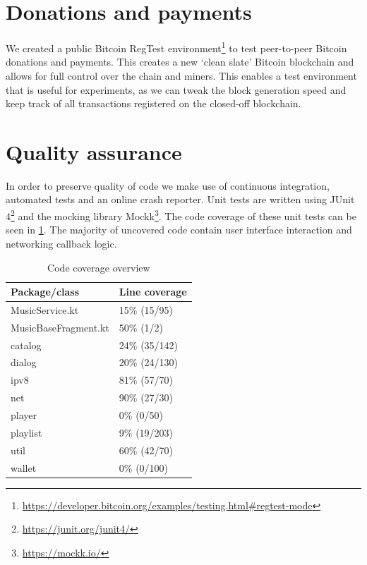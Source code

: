 \section{Donations and payments}
\label{sec:regtest-network-impl}
We created a public Bitcoin RegTest environment\footnote{\url{https://developer.bitcoin.org/examples/testing.html\#regtest-mode}} to test peer-to-peer Bitcoin donations and payments. This creates a new `clean slate' Bitcoin blockchain and allows for full control over the chain and miners. This enables a test environment that is useful for experiments, as we can tweak the block generation speed and keep track of all transactions registered on the closed-off blockchain.

\section{Quality assurance}
In order to preserve quality of code we make use of continuous integration, automated tests and an online crash reporter. Unit tests are written using JUnit 4\footnote{\url{https://junit.org/junit4/}} and the mocking library Mockk\footnote{\url{https://mockk.io/}}. The code coverage of these unit tests can be seen in \ref{tab:code-cov}. The majority of uncovered code contain user interface interaction and networking callback logic. 

\begin{table}[]
\begin{tabular}{|l|l|}
\hline
\textbf{Package/class} & \textbf{Line coverage} \\ \hline
MusicService.kt        & 15\% (15/95)           \\ \hline
MusicBaseFragment.kt   & 50\% (1/2)             \\ \hline
catalog                & 24\% (35/142)          \\ \hline
dialog                 & 20\% (24/130)          \\ \hline
ipv8                   & 81\% (57/70)           \\ \hline
net                    & 90\% (27/30)           \\ \hline
player                 & 0\% (0/50)             \\ \hline
playlist               & 9\% (19/203)           \\ \hline
util                   & 60\% (42/70)           \\ \hline
wallet                 & 0\% (0/100)            \\ \hline
\end{tabular}
\caption{Code coverage overview}
\label{tab:code-cov}
\end{table}

